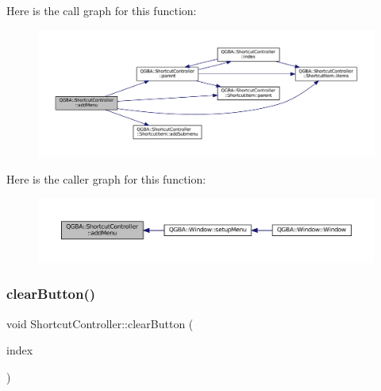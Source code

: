 Here is the call graph for this function\+:
\nopagebreak
\begin{figure}[H]
\begin{center}
\leavevmode
\includegraphics[width=350pt]{class_q_g_b_a_1_1_shortcut_controller_adf81c5bc2cb82ad7388892338ab0b68b_cgraph}
\end{center}
\end{figure}
Here is the caller graph for this function\+:
\nopagebreak
\begin{figure}[H]
\begin{center}
\leavevmode
\includegraphics[width=350pt]{class_q_g_b_a_1_1_shortcut_controller_adf81c5bc2cb82ad7388892338ab0b68b_icgraph}
\end{center}
\end{figure}
\mbox{\label{class_q_g_b_a_1_1_shortcut_controller_a0dee45b9b1236169cc78028924a60325}} 
\subsubsection{\texorpdfstring{clear\+Button()}{clearButton()}}
{\footnotesize\ttfamily void Shortcut\+Controller\+::clear\+Button (\begin{DoxyParamCaption}\item[{const Q\+Model\+Index \&}]{index }\end{DoxyParamCaption})}


